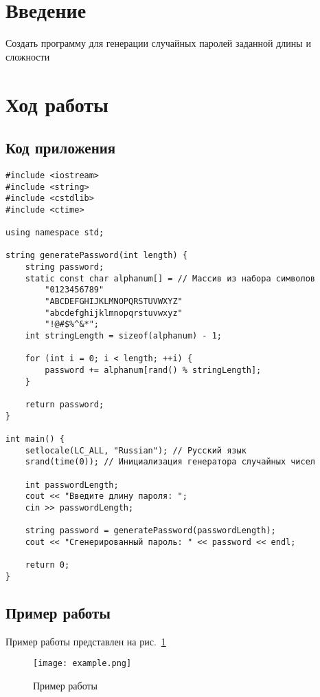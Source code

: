 \documentclass[12pt,a4paper]{scrartcl}
\begin{document}
\section{Введение}
\label{sec:intro}

Создать программу для генерации случайных паролей заданной длины и сложности

\section{Ход работы}
\label{sec:exp}

\subsection{Код приложения}
\label{sec:exp:code}
\begin{verbatim}
#include <iostream>
#include <string>
#include <cstdlib>
#include <ctime>

using namespace std;

string generatePassword(int length) {
    string password;
    static const char alphanum[] = // Массив из набора символов
        "0123456789"
        "ABCDEFGHIJKLMNOPQRSTUVWXYZ"
        "abcdefghijklmnopqrstuvwxyz"
        "!@#$%^&*";
    int stringLength = sizeof(alphanum) - 1;

    for (int i = 0; i < length; ++i) {
        password += alphanum[rand() % stringLength];
    }

    return password;
}

int main() {
    setlocale(LC_ALL, "Russian"); // Русский язык
    srand(time(0)); // Инициализация генератора случайных чисел

    int passwordLength;
    cout << "Введите длину пароля: ";
    cin >> passwordLength;

    string password = generatePassword(passwordLength);
    cout << "Сгенерированный пароль: " << password << endl;

    return 0;
}
\end{verbatim}

\subsection{Пример работы}
\label{sec:example}
Пример работы представлен на рис.~\ref{fig:enter-label}
\begin{figure}[h]
    \centering
    \texttt{[image: example.png]}
    \caption{Пример работы}\label{fig:enter-label}
\end{figure}
\end{document}
